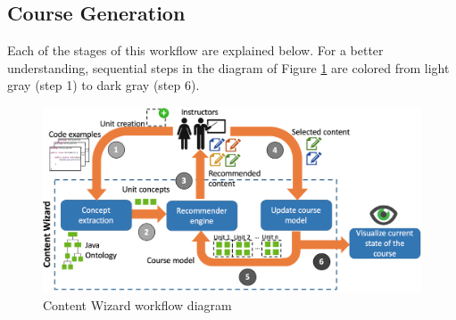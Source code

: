 \documentclass{sig-alternate}
\begin{document}
\subsection{Course Generation}
Each of the stages of this workflow are explained below. For a
better understanding, sequential steps in the diagram of Figure \ref{fig:fig3}
are colored from light gray (step 1) to dark gray (step 6).
\begin{figure}[t!]
\centering
\includegraphics[width=160mm]{obr4.png}
\caption{Content Wizard workflow diagram}
\label{fig:fig3}
\end{figure}
\end{document}
